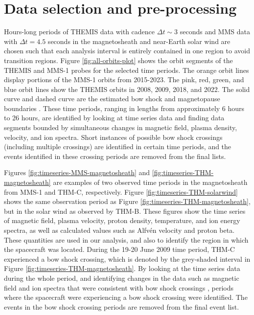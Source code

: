 \section{Data selection and pre-processing}
Hours-long periods of THEMIS data with cadence $\Delta t\sim$3 seconds and MMS data with $\Delta t=4.5$ seconds in the magnetosheath and near-Earth solar wind are chosen such that each analysis interval is entirely contained in one region to avoid transition regions. Figure \ref{fig:all-orbits-plot} shows the orbit segments of the THEMIS and MMS-1 probes for the selected time periods. The orange orbit lines display portions of the MMS-1 orbits from 2015-2023. The pink, red, green, and blue orbit lines show the THEMIS orbits in 2008, 2009, 2018, and 2022. The solid curve and dashed curve are the estimated bow shock and magnetopause boundaries \citep{SlavinHolzer:1984,Shue:1997}. These time periods, ranging in lengths from approximately 6 hours to 26 hours, are identified by looking at time series data and finding data segments bounded by simultaneous changes in magnetic field, plasma density, velocity, and ion spectra. Short instances of possible bow shock crossings (including multiple crossings) are identified in certain time periods, and the events identified in these crossing periods are removed from the final lists.

Figures \ref{fig:timeseries-MMS-magnetosheath} and \ref{fig:timeseries-THM-magnetosheath} are examples of two observed time periods in the magnetosheath from MMS-1 and THM-C, respectively. Figure \ref{fig:timeseries-THM-solarwind} shows the same observation period as Figure \ref{fig:timeseries-THM-magnetosheath}, but in the solar wind as observed by THM-B. These figures show the time series of magnetic field, plasma velocity, proton density, temperature, and ion energy spectra, as well as calculated values such as Alfv\'en velocity and proton beta. These quantities are used in our analysis, and also to identify the region in which the spacecraft was located. During the 19-20 June 2009 time period, THM-C experienced a bow shock crossing, which is denoted by the grey-shaded interval in Figure \ref{fig:timeseries-THM-magnetosheath}. By looking at the time series data during the whole period, and identifying changes in the data such as magnetic field and ion spectra that were consistent with bow shock crossings \citep{Lalti:2022,Trotta:2022}, periods where the spacecraft were experiencing a bow shock crossing were identified. The events in the bow shock crossing periods are removed from the final event list.

